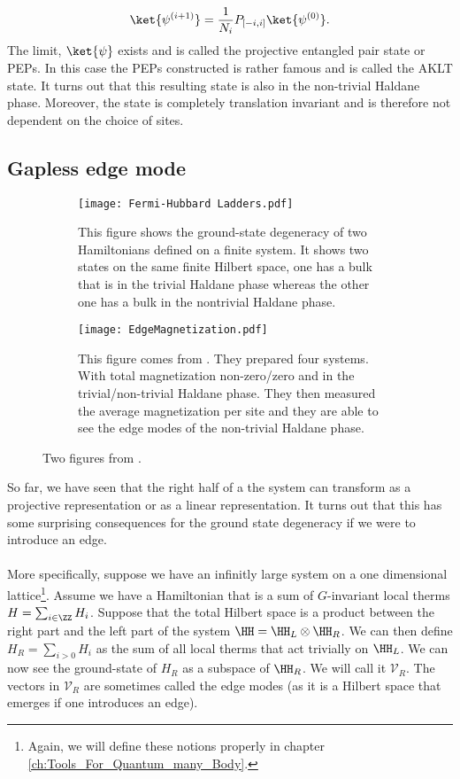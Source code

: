 \begin{equation}
	\ket{\psi^{(i+1)}}=\frac{1}{N_i}P_{[-i,i]}\ket{\psi^{(0)}}.
\end{equation}
The limit, $\ket{\psi}$ exists and is called the projective entangled pair state or PEPs. In this case the PEPs constructed is rather famous and is called the AKLT state. It turns out that this resulting state is also in the non-trivial Haldane phase. Moreover, the state is completely translation invariant and is therefore not dependent on the choice of sites.
\subsection{Gapless edge mode}\label{sec:gapless-edge-mode}
\begin{figure}
	\begin{subfigure}[b]{0.45\textwidth}
		\centering
		\texttt{[image: Fermi-Hubbard Ladders.pdf]}
		\caption{This figure shows the ground-state degeneracy of two Hamiltonians defined on a finite system. It shows two states on the same finite Hilbert space, one has a bulk that is in the trivial Haldane phase whereas the other one has a bulk in the nontrivial Haldane phase.}
		\label{fig:EdgeModesInHaldanePhase}
	\end{subfigure}
	\hfil
	\begin{subfigure}[b]{0.45\textwidth}
		\centering
		\texttt{[image: EdgeMagnetization.pdf]}
		\caption{This figure comes from \cite{sompet2022realizing}. They prepared four systems. With total magnetization non-zero/zero and in the trivial/non-trivial Haldane phase. They then measured the average magnetization per site and they are able to see the edge modes of the non-trivial Haldane phase.}
		\label{fig:EdgeMagnetization}
	\end{subfigure}
	\caption{Two figures from \cite{sompet2022realizing}.}
	\label{fig:EdgeModesInHaldanePhaseBoth}
\end{figure}
So far, we have seen that the right half of a the system can transform as a projective representation or as a linear representation. It turns out that this has some surprising consequences for the ground state degeneracy if we were to introduce an edge.
\\\\
More specifically, suppose we have an infinitly large system on a one dimensional lattice\footnote{Again, we will define these notions properly in chapter \ref{ch:Tools_For_Quantum_many_Body}.}. Assume we have a Hamiltonian that is a sum of $G$-invariant local therms $H=\sum_{i\in\ZZ} H_i$. Suppose that the total Hilbert space is a product between the right part and the left part of the system $\HH=\HH_L\otimes\HH_R$. We can then define $H_R=\sum_{i>0}H_i$ as the sum of all local therms that act trivially on $\HH_L$. We can now see the ground-state of $H_R$ as a subspace of $\HH_R$. We will call it $\mathcal{V}_R$. The vectors in $\mathcal{V}_R$ are sometimes called the edge modes (as it is a Hilbert space that emerges if one introduces an edge).
